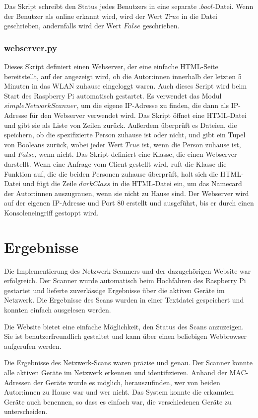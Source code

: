 \documentclass[12pt]{article}
\begin{document}
Das Skript schreibt den Status jedes Benutzers in eine separate $.bool$-Datei. Wenn der Benutzer als online erkannt wird, wird der Wert $True$ in die Datei geschrieben, andernfalls wird der Wert $False$ geschrieben.

\subsubsection{webserver.py}

Dieses Skript definiert einen Webserver, der eine einfache HTML-Seite bereitstellt, auf der angezeigt wird, ob die Autor:innen innerhalb der letzten 5 Minuten in das WLAN zuhause eingeloggt waren. Auch dieses Script wird beim Start des Raspberry Pi automatisch gestartet. Es verwendet das Modul $simpleNetworkScanner$, um die eigene IP-Adresse zu finden, die dann als IP-Adresse für den Webserver verwendet wird. Das Skript öffnet eine HTML-Datei und gibt sie als Liste von Zeilen zurück. Außerdem überprüft es Dateien, die speichern, ob die spezifizierte Person zuhause ist oder nicht, und gibt ein Tupel von Booleans zurück, wobei jeder Wert $True$ ist, wenn die Person zuhause ist, und $False$, wenn nicht. Das Skript definiert eine Klasse, die einen Webserver darstellt. Wenn eine Anfrage vom Client gestellt wird, ruft die Klasse die Funktion auf, die die beiden Personen zuhause überprüft, holt sich die HTML-Datei und fügt die Zeile $darkClass$ in die HTML-Datei ein, um das Namecard der Autor:innen auszugrauen, wenn sie nicht zu Hause sind. Der Webserver wird auf der eigenen IP-Adresse und Port 80 erstellt und ausgeführt, bis er durch einen Konsoleneingriff gestoppt wird.

\newpage
\section{Ergebnisse}
Die Implementierung des Netzwerk-Scanners und der dazugehörigen Website war erfolgreich. Der Scanner wurde automatisch beim Hochfahren des Raspberry Pi gestartet und lieferte zuverlässige Ergebnisse über die aktiven Geräte im Netzwerk. Die Ergebnisse des Scans wurden in einer Textdatei gespeichert und konnten einfach ausgelesen werden.

Die Website bietet eine einfache Möglichkeit, den Status des Scans anzuzeigen. Sie ist benutzerfreundlich gestaltet und kann über einen beliebigen Webbrowser aufgerufen werden.

Die Ergebnisse des Netzwerk-Scans waren präzise und genau. Der Scanner konnte alle aktiven Geräte im Netzwerk erkennen und identifizieren. Anhand der MAC-Adressen der Geräte wurde es möglich, herauszufinden, wer von beiden Autor:innen zu Hause war und wer nicht. Das System konnte die erkannten Geräte auch benennen, so dass es einfach war, die verschiedenen Geräte zu unterscheiden.
\end{document}

